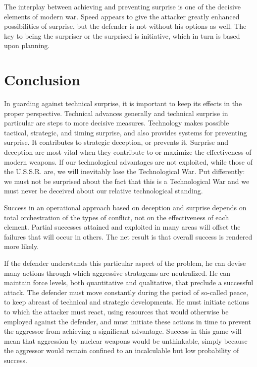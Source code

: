 The interplay between achieving and preventing surprise is one of the decisive elements of modern war. Speed appears to give the attacker greatly enhanced possibilities of surprise, but the defender is not without his options as well. The key to being the surpriser or the surprised is initiative, which in turn is based upon planning.

\section{Conclusion}
In guarding against technical surprise, it is important to keep its effects in the proper perspective. Technical advances generally and technical surprise in particular are steps to more decisive measures. Technology makes possible tactical, strategic, and timing surprise, and also provides systems for preventing surprise. It contributes to strategic deception, or prevents it. Surprise and deception are most vital when they contribute to or maximize the effectiveness of modern weapons. If our technological advantages are not exploited, while those of the U.S.S.R. are, we will inevitably lose the Technological War. Put differently: we must not be surprised about the fact that this is a Technological War and we must never be deceived about our relative technological standing.

Success in an operational approach based on deception and surprise depends on total orchestration of the types of conflict, not on the effectiveness of each element. Partial successes attained and exploited in many areas will offset the failures that will occur in others. The net result is that overall success is rendered more likely.

If the defender understands this particular aspect of the problem, he can devise many actions through which aggressive stratagems are neutralized. He can maintain force levels, both quantitative and qualitative, that preclude a successful attack. The defender must move constantly during the period of so-called peace, to keep abreast of technical and strategic developments. He must initiate actions to which the attacker must react, using resources that would otherwise be employed against the defender, and must initiate these actions in time to prevent the aggressor from achieving a significant advantage. Success in this game will mean that aggression by nuclear weapons would be unthinkable, simply because the aggressor would remain confined to an incalculable but low probability of success.

